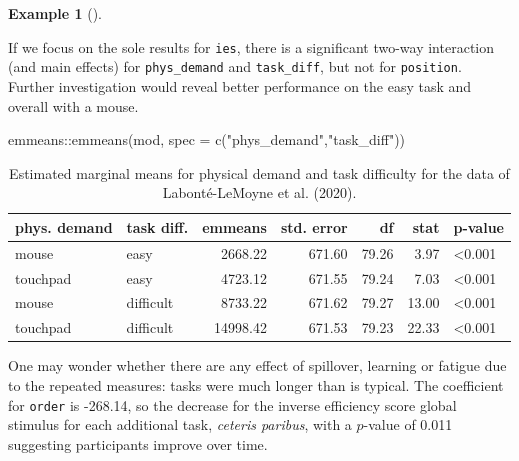 \documentclass[
  11pt,
  letterpaper,
]{scrbook}
\newenvironment{Shaded}{\begin{snugshade}}{\end{snugshade}}
\newcommand{\AttributeTok}[1]{\textcolor[rgb]{0.40,0.45,0.13}{#1}}
\newcommand{\FunctionTok}[1]{\textcolor[rgb]{0.28,0.35,0.67}{#1}}
\newcommand{\NormalTok}[1]{\textcolor[rgb]{0.00,0.23,0.31}{#1}}
\newcommand{\SpecialCharTok}[1]{\textcolor[rgb]{0.37,0.37,0.37}{#1}}
\newcommand{\StringTok}[1]{\textcolor[rgb]{0.13,0.47,0.30}{#1}}
\theoremstyle{definition}
\theoremstyle{definition}
\newtheorem{example}{Example}[chapter]
\theoremstyle{remark}
\begin{document}
\begin{example}[]
\begin{longtable}[]
\end{longtable}

If we focus on the sole results for \texttt{ies}, there is a significant
two-way interaction (and main effects) for \texttt{phys\_demand} and
\texttt{task\_diff}, but not for \texttt{position}. Further
investigation would reveal better performance on the easy task and
overall with a mouse.

\begin{Shaded}
\begin{Highlighting}[]
\NormalTok{emmeans}\SpecialCharTok{::}\FunctionTok{emmeans}\NormalTok{(mod, }\AttributeTok{spec =} \FunctionTok{c}\NormalTok{(}\StringTok{"phys\_demand"}\NormalTok{,}\StringTok{"task\_diff"}\NormalTok{))}
\end{Highlighting}
\end{Shaded}

\begin{longtable}[]{@{}llrrrrl@{}}

\caption{\label{tbl-labonte-emmeans}Estimated marginal means for
physical demand and task difficulty for the data of Labonté-LeMoyne et
al. (2020).}

\tabularnewline

\toprule\noalign{}
phys. demand & task diff. & emmeans & std. error & df & stat &
p-value \\
\midrule\noalign{}
\endhead
\bottomrule\noalign{}
\endlastfoot
mouse & easy & 2668.22 & 671.60 & 79.26 & 3.97 & \textless0.001 \\
touchpad & easy & 4723.12 & 671.55 & 79.24 & 7.03 & \textless0.001 \\
mouse & difficult & 8733.22 & 671.62 & 79.27 & 13.00 & \textless0.001 \\
touchpad & difficult & 14998.42 & 671.53 & 79.23 & 22.33 &
\textless0.001 \\

\end{longtable}

One may wonder whether there are any effect of spillover, learning or
fatigue due to the repeated measures: tasks were much longer than is
typical. The coefficient for \texttt{order} is -268.14, so the decrease
for the inverse efficiency score global stimulus for each additional
task, \emph{ceteris paribus}, with a \(p\)-value of 0.011 suggesting
participants improve over time.

\begin{figure}[ht!]

\centering{

}
\end{figure}
\end{example}
\end{document}
